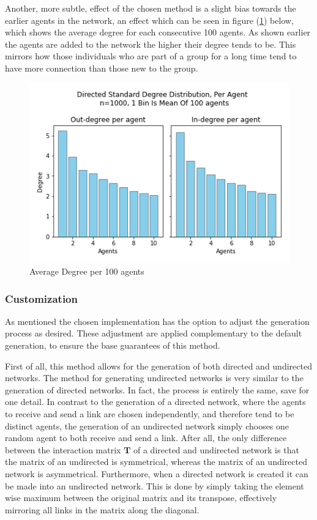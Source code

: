 \documentclass{article}
\newcommand{\T}{\textbf{T}}
\begin{document}
Another, more subtle, effect of the chosen method is a slight bias towards the earlier agents in the network, an effect which can be seen in figure (\ref{degree:agent}) below, which shows the average degree for each consecutive 100 agents. As shown earlier the agents are added to the network the higher their degree tends to be. This mirrors how those individuals who are part of a group for a long time tend to have more connection than those new to the group.

\begin{center}
    \begin{figure}[!htbp]
        \centering
        \includegraphics[width=.8\textwidth]{ThesisKI/Images/DirectedStandardPerAgent.png}
        \caption{Average Degree per 100 agents}
        \label{degree:agent}
    \end{figure}
\end{center}
\newpage
\subsubsection{Customization}

As mentioned the chosen implementation has the option to adjust the generation process as desired. These adjustment are applied complementary to the default generation, to ensure the base guarantees of this method. \newline

First of all, this method allows for the generation of both directed and undirected networks. The method for generating undirected networks is very similar to the generation of directed networks. In fact, the process is entirely the same, save for one detail. In contrast to the generation of a directed network, where the agents to receive and send a link are chosen independently, and therefore tend to be distinct agents, the generation of an undirected network simply chooses one random agent to both receive and send a link. After all, the only difference between the interaction matrix $\T$ of a directed and undirected network is that the matrix of an undirected is symmetrical, whereas the matrix of an undirected network is asymmetrical. \newline
Furthermore, when a directed network is created it can be made into an undirected network. This is done by simply taking the element wise maximum between the original matrix and its transpose, effectively mirroring all links in the matrix along the diagonal. \newline
\end{document}
